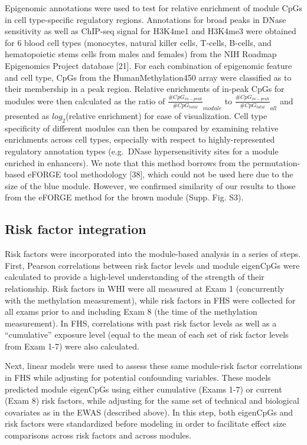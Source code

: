 \documentclass[]{article}
\theoremstyle{definition}
\theoremstyle{definition}
\theoremstyle{definition}
\theoremstyle{remark}
\begin{document}
Epigenomic annotations were used to test for relative enrichment of
module CpGs in cell type-specific regulatory regions. Annotations for
broad peaks in DNase sensitivity as well as ChIP-seq signal for H3K4me1
and H3K4me3 were obtained for 6 blood cell types (monocytes, natural
killer cells, T-cells, B-cells, and hematopoietic stems cells from males
and females) from the NIH Roadmap Epigenomics Project database {[}21{]}.
For each combination of epigenomic feature and cell type, CpGs from the
HumanMethylation450 array were classified as to their membership in a
peak region. Relative enrichments of in-peak CpGs for modules were then
calculated as the ratio of
\(\frac{\#CpG_{in-peak}}{\#CpG_{total}}_{module}\) to
\(\frac{\#CpG_{in-peak}}{\#CpG_{total}}_{all}\) and presented as
\(log_2\)(relative enrichment) for ease of visualization. Cell type
specificity of different modules can then be compared by examining
relative enrichments across cell types, especially with respect to
highly-represented regulatory annotation types (e.g.~DNase
hypersensitivity sites for a module enriched in enhancers). We note that
this method borrows from the permutation-based eFORGE tool methodology
{[}38{]}, which could not be used here due to the size of the blue
module. However, we confirmed similarity of our results to those from
the eFORGE method for the brown module (Supp. Fig. S3).

\subsection{Risk factor integration}\label{risk-factor-integration}

Risk factors were incorporated into the module-based analysis in a
series of steps. First, Pearson correlations between risk factor levels
and module eigenCpGs were calculated to provide a high-level
understanding of the strength of their relationship. Risk factors in WHI
were all measured at Exam 1 (concurrently with the methylation
measurement), while risk factors in FHS were collected for all exams
prior to and including Exam 8 (the time of the methylation measurement).
In FHS, correlations with past risk factor levels as well as a
``cumulative'' exposure level (equal to the mean of each set of risk
factor levels from Exam 1-7) were also calculated.

Next, linear models were used to assess these same module-risk factor
correlations in FHS while adjusting for potential confounding variables.
These models predicted module eigenCpGs using either cumulative (Exams
1-7) or current (Exam 8) risk factors, while adjusting for the same set
of technical and biological covariates as in the EWAS (described above).
In this step, both eigenCpGs and risk factors were standardized before
modeling in order to facilitate effect size comparisons across risk
factors and across modules.
\end{document}
